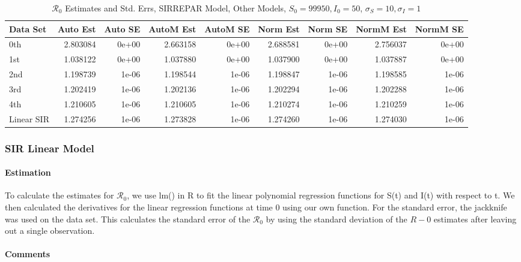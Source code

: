 \documentclass[12pt]{article}
\newcommand{\rr}{\ensuremath{\mathcal{R}_0}}
\begin{document}
\begin{table}[H]
	
	\caption{$\rr$ Estimates and Std. Errs, SIRREPAR Model,
		Other Models, $S_0 = 99950, I_0 = 50$, 
		$\sigma_S = 10, \sigma_I = 1$}
	\begin{footnotesize}
		\hskip -1cm
	\begin{tabular}{l|r|r|r|r|r|r|r|r}
		\hline
		Data Set & Auto Est & Auto SE & AutoM Est & AutoM SE & Norm Est & Norm SE & NormM Est & NormM SE\\
		\hline
		0th & 2.803084 & 0e+00 & 2.663158 & 0e+00 & 2.688581 & 0e+00 & 2.756037 & 0e+00\\
		\hline
		1st & 1.038122 & 0e+00 & 1.037880 & 0e+00 & 1.037900 & 0e+00 & 1.037887 & 0e+00\\
		\hline
		2nd & 1.198739 & 1e-06 & 1.198544 & 1e-06 & 1.198847 & 1e-06 & 1.198585 & 1e-06\\
		\hline
		3rd & 1.202419 & 1e-06 & 1.202136 & 1e-06 & 1.202294 & 1e-06 & 1.202288 & 1e-06\\
		\hline
		4th & 1.210605 & 1e-06 & 1.210605 & 1e-06 & 1.210274 & 1e-06 & 1.210259 & 1e-06\\
		\hline
		Linear SIR & 1.274256 & 1e-06 & 1.273828 & 1e-06 & 1.274260 & 1e-06 & 1.274030 & 1e-06\\
		\hline
	\end{tabular}
	\end{footnotesize}
\end{table}

\subsubsection{SIR Linear Model}

\paragraph{Estimation}

To calculate the estimates for $\rr$, we use lm() in R to fit the linear polynomial regression functions for S(t) and I(t) with respect to t. We then calculated the derivatives for the linear regression functions at time 0 using our own function. For the standard error, the jackknife was used on the data set. This calculates the standard error of the $\rr$ by using the standard deviation of the $R-0$ estimates after leaving out a single observation.

\paragraph{Comments}
\end{document}
